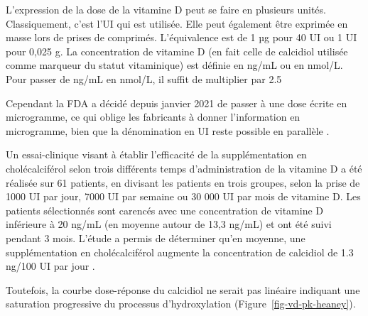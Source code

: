 \documentclass[
  a4paper,
  DIV=11,
  numbers=noendperiod,
  listof=totoc]{scrreprt}
\begin{document}
L'expression de la dose de la vitamine D peut se faire en plusieurs
unités. Classiquement, c'est l'\ac{UI} qui est utilisée. Elle peut
également être exprimée en masse lors de prises de comprimés.
L'équivalence est de 1 µg pour 40 \ac{UI} ou 1 \ac{UI} pour 0,025 g. La
concentration de vitamine D (en fait celle de calcidiol utilisée comme
marqueur du statut vitaminique) est définie en ng/mL ou en nmol/L. Pour
passer de ng/mL en nmol/L, il suffit de multiplier par 2.5
\autocite{Pramyothin.2012}

Cependant la \ac{FDA} a décidé depuis janvier 2021 de passer à une dose
écrite en microgramme, ce qui oblige les fabricants à donner
l'information en microgramme, bien que la dénomination en UI reste
possible en parallèle \autocite{HHS.2016}.

Un essai-clinique visant à établir l'efficacité de la supplémentation en
cholécalciférol selon trois différents temps d'administration de la
vitamine D a été réalisée sur 61 patients, en divisant les patients en
trois groupes, selon la prise de 1000 UI par jour, 7000 UI par semaine
ou 30 000 UI par mois de vitamine D. Les patients sélectionnés sont
carencés avec une concentration de vitamine D inférieure à 20 ng/mL (en
moyenne autour de 13,3 ng/mL) et ont été suivi pendant 3 mois. L'étude a
permis de déterminer qu'en moyenne, une supplémentation en
cholécalciférol augmente la concentration de calcidiol de 1.3 ng/100 UI
par jour \autocite{Takács.2017}.

Toutefois, la courbe dose-réponse du calcidiol ne serait pas linéaire
indiquant une saturation progressive du processus d'hydroxylation
\autocite{Garland.2011,IOM.2011} (Figure~\ref{fig-vd-pk-heaney}).
\end{document}

